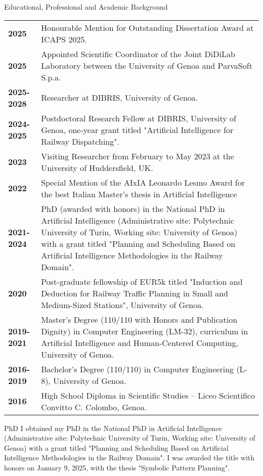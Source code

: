 \documentclass{resume} %
\begin{document}

\begin{rSection}{Educational, Professional and Academic Background}

\begin{tabularx}{0.95\textwidth} {lp{14cm}}
	\textbf{2025} & Honourable Mention for Outstanding Dissertation Award at ICAPS 2025.\\
 \textbf{2025} & Appointed Scientific Coordinator of the Joint DiDiLab Laboratory between the University of Genoa and ParvaSoft S.p.a.  \\
 \textbf{2025-2028} & Researcher at DIBRIS, University of Genoa.  \\
 \textbf{2024-2025} & Postdoctoral Research Fellow at DIBRIS, University of Genoa, one-year grant titled "Artificial Intelligence for Railway Dispatching".  \\
 \textbf{2023}  & Visiting Researcher from February to May 2023 at the University of Huddersfield, UK.\\
  \textbf{2022}  & Special Mention of the AIxIA Leonardo Lesmo Award for the best Italian Master's thesis in Artificial Intelligence\\
 \textbf{2021-2024}  & PhD (awarded with honors) in the National PhD in Artificial Intelligence (Administrative site: Polytechnic University of Turin, Working site: University of Genoa) with a grant titled "Planning and Scheduling Based on Artificial Intelligence Methodologies in the Railway Domain".\\
 \textbf{2020} & Post-graduate fellowship of EUR5k titled "Induction and Deduction for Railway Traffic Planning in Small and Medium-Sized Stations", University of Genoa. \\
 \textbf{2019-2021}  & Master’s Degree (110/110 with Honors and Publication Dignity) in Computer Engineering (LM-32), curriculum in Artificial Intelligence and Human-Centered Computing, University of Genoa.  \\
 \textbf{2016-2019}  & Bachelor’s Degree (110/110) in Computer Engineering (L-8), University of Genoa. \\
 \textbf{2016}  & High School Diploma in Scientific Studies – Liceo Scientifico Convitto C. Colombo, Genoa. 
\end{tabularx}
\end{rSection}
\begin{rSection}{PhD}
	I obtained my PhD in the National PhD in Artificial Intelligence (Administrative site: Polytechnic University of Turin, Working site: University of Genoa) with a grant titled "Planning and Scheduling Based on Artificial Intelligence Methodologies in the Railway Domain". I was awarded the title with honors on January 9, 2025, with the thesis "Symbolic Pattern Planning".
\end{rSection}
\end{document}
